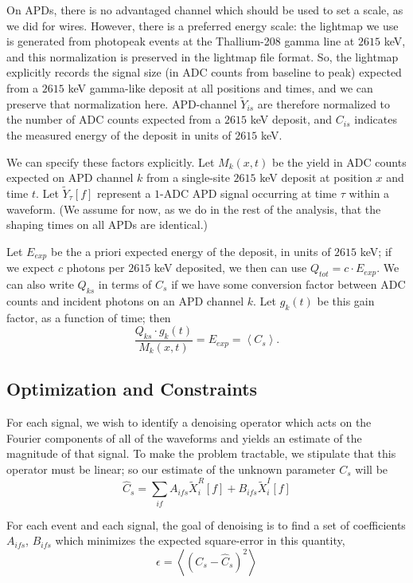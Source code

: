 On APDs, there is no advantaged channel which should be used to set a scale, as we did for wires.  However, there is a preferred energy scale: the lightmap we use is generated from photopeak events at the Thallium-208 gamma line at $2615$ keV, and this normalization is preserved in the lightmap file format.  So, the lightmap explicitly records the signal size (in ADC counts from baseline to peak) expected from a $2615$ keV gamma-like deposit at all positions and times, and we can preserve that normalization here.  APD-channel $\widetilde{Y}_{is}$ are therefore normalized to the number of ADC counts expected from a $2615$ keV deposit, and $C_{is}$ indicates the measured energy of the deposit in units of $2615$ keV.

We can specify these factors explicitly.  Let $M_k(x,t)$ be the yield in ADC counts expected on APD channel $k$ from a single-site $2615$ keV deposit at position $x$ and time $t$.  Let $\widetilde{Y}_{\tau}[f]$ represent a $1$-ADC APD signal occurring at time $\tau$ within a waveform.  (We assume for now, as we do in the rest of the analysis, that the shaping times on all APDs are identical.)

Let $E_{exp}$ be the a priori expected energy of the deposit, in units of $2615$ keV; if we expect $c$ photons per $2615$ keV deposited, we then can use $Q_{tot} = c \cdot E_{exp}$.  We can also write $Q_{ks}$ in terms of $C_s$ if we have some conversion factor between ADC counts and incident photons on an APD channel $k$.  Let $g_{k}(t)$ be this gain factor, as a function of time; then \[\frac{Q_{ks}\cdot g_k(t)}{M_k(x,t)} = E_{exp} = \left<C_s\right>.\]

\subsection{Optimization and Constraints}

For each signal, we wish to identify a denoising operator which acts on the Fourier components of all of the waveforms and yields an estimate of the magnitude of that signal.  To make the problem tractable, we stipulate that this operator must be linear; so our estimate of the unknown parameter $C_s$ will be
\[ \widehat{C}_s = \sum_{if} A_{ifs} \widetilde{X}_i^R[f] + B_{ifs} \widetilde{X}_i^I[f]\]

For each event and each signal, the goal of denoising is to find a set of coefficients $A_{ifs}$, $B_{ifs}$ which minimizes the expected square-error in this quantity,
\[ \epsilon = \left< \left(C_s - \widehat{C}_s\right)^2\right> \]

